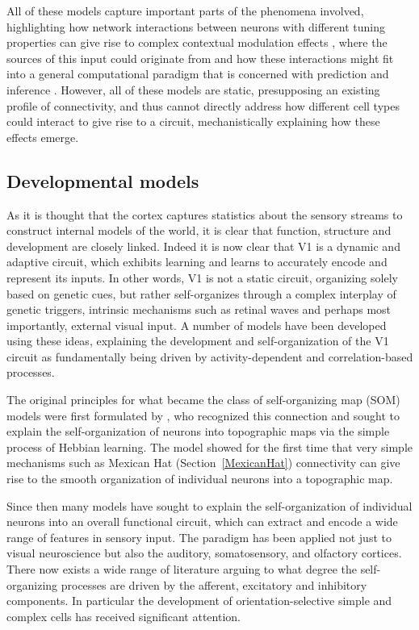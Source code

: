 All of these models capture important parts of the phenomena involved,
highlighting how network interactions between neurons with different
tuning properties can give rise to complex contextual modulation
effects \citep{Li2002}, where the sources of this input could
originate from \citep{Schwabe2006} and how these interactions might
fit into a general computational paradigm that is concerned with
prediction and inference \citep{Spratling2010, Coen2015}. However, all
of these models are static, presupposing an existing profile of
connectivity, and thus cannot directly address how different cell
types could interact to give rise to a circuit, mechanistically
explaining how these effects emerge.

\subsection{Developmental models} \label{devmodels}

As it is thought that the cortex captures statistics about the sensory
streams to construct internal models of the world, it is clear that
function, structure and development are closely linked. Indeed it is
now clear that V1 is a dynamic and adaptive circuit, which exhibits
learning and learns to accurately encode and represent its inputs. In
other words, V1 is not a static circuit, organizing solely based on
genetic cues, but rather self-organizes through a complex interplay of
genetic triggers, intrinsic mechanisms such as retinal waves and
perhaps most importantly, external visual input. A number of models
have been developed using these ideas, explaining the development and
self-organization of the V1 circuit as fundamentally being driven by
activity-dependent and correlation-based processes.

The original principles for what became the class of self-organizing
map (SOM) models were first formulated by \citep{VonderMalsburg1973},
who recognized this connection and sought to explain the
self-organization of neurons into topographic maps via the simple
process of Hebbian learning. The \cite{VonderMalsburg1973} model
showed for the first time that very simple mechanisms such as Mexican
Hat (Section~\ref{MexicanHat}) connectivity can give rise to the
smooth organization of individual neurons into a topographic map.

Since then many models have sought to explain the
self-organization of individual neurons into an overall functional
circuit, which can extract and encode a wide range of features in
sensory input. The paradigm has been applied not just to visual
neuroscience but also the auditory, somatosensory, and olfactory
cortices. There now exists a wide range of literature arguing to what
degree the self-organizing processes are driven by the afferent,
excitatory and inhibitory components. In particular the development of
orientation-selective simple and complex cells has received
significant attention.


